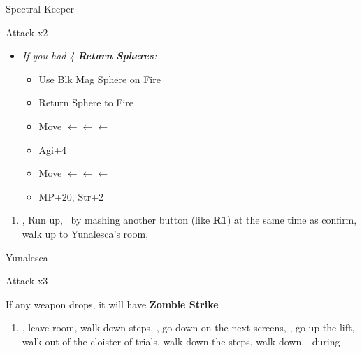 \begin{battle}[52000]{Spectral Keeper}
    \begin{itemize}
        \summon{\bahamut}
        \bahamutf Attack x2
    \end{itemize}
\end{battle}
\bothvfill\winvfill\lossvfill
\begin{spheregrid}
    \begin{itemize}
        \item \textit{If you had 4 \textbf{Return Spheres}:}
        \begin{itemize}
            \item Use Blk Mag Sphere on Fire
            \item Return Sphere to Fire
            \item Move $\leftarrow\leftarrow\leftarrow$
            \item Agi+4
            \item Move $\leftarrow\leftarrow\leftarrow$
            \item MP+20, Str+2
        \end{itemize}
    \end{itemize}
\end{spheregrid}
\begin{enumerate}[resume]
    \item \save, Run up, \sd\ by mashing another button (like \textbf{R1}) at the same time as confirm, walk up to Yunalesca's room, \sd
\end{enumerate}
\begin{battle}[132000]{Yunalesca}
    \begin{itemize}
        \summon{\bahamut}
        \bahamutf Attack x3
    \end{itemize}
    If any weapon drops, it will have \textbf{Zombie Strike}
\end{battle}
\begin{enumerate}[resume]
    \item \sd, leave room, walk down steps, \sd, go down on the next screens, \save, go up the lift, walk out of the cloister of trials, walk down the steps, walk down, \sd\ during \cs+\skippablefmv
\end{enumerate}